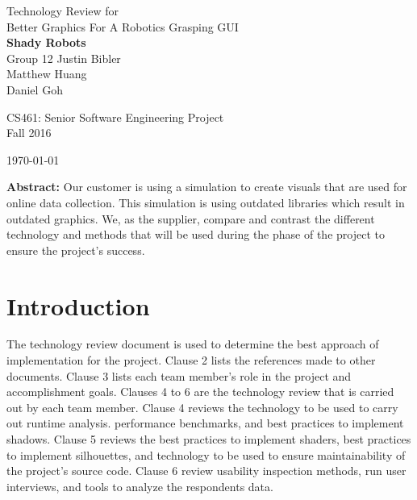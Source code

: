 \documentclass[10pt,journal,compsoc,draftclsnofoot]{IEEEtran}
\begin{document}
\onecolumn

\begin{titlepage}
\null
\vspace{20mm}

\begin{flushleft}
\begin{bfseries}
	\vskip2mm
	\Huge{Technology Review for\\ Better Graphics For A Robotics Grasping GUI}\\
	\vspace{30mm}
	\textbf{\huge Shady Robots} \\
	\vskip2mm
	\large{Group 12}
	\vskip5mm
	\Large{Justin Bibler \\
	Matthew Huang \\
	Daniel Goh \\}
\end{bfseries}

\vspace{15mm}
\Large{CS461: Senior Software Engineering Project} \\
\Large{Fall 2016} \\

\vspace{10mm}

\today

\vfill

\begin{normalsize}
{\bf Abstract:}
Our customer is using a simulation to create visuals that are used for online data collection.
This simulation is using outdated libraries which result in outdated graphics.
We, as the supplier, compare and contrast the different technology and methods that will be used during the phase of the project to ensure the project's success.
\end{normalsize}
\end{flushleft}
\end{titlepage}

\section{Introduction}
\vspace{3mm}
The technology review document is used to determine the best approach of implementation for the project. 
Clause 2 lists the references made to other documents.
Clause 3 lists each team member's role in the project and accomplishment goals.
Clauses 4 to 6 are the technology review that is carried out by each team member.
Clause 4 reviews the technology to be used to carry out runtime analysis. performance benchmarks, and best practices to implement shadows.
Clause 5 reviews the best practices to implement shaders, best practices to implement silhouettes, and technology to be used to ensure maintainability of the project's source code.
Clause 6 review usability inspection methods, run user interviews, and tools to analyze the respondents data.
\end{document}
